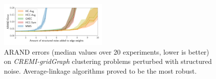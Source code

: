 

\begin{figure}[t]
\centering
\includegraphics[width=0.47\textwidth,trim=0.2in 0.17in 0.2in 0.2in,clip]{./figs/noise_plots/noise_plots_adapted-rand_1.pdf}
        \caption{
ARAND errors (median values over 20 experiments, lower is better) on \emph{CREMI-gridGraph} clustering problems perturbed with structured noise. Average-linkage algorithms proved to be the most robust.
}\label{fig:scores_structured_noise}
\end{figure}


